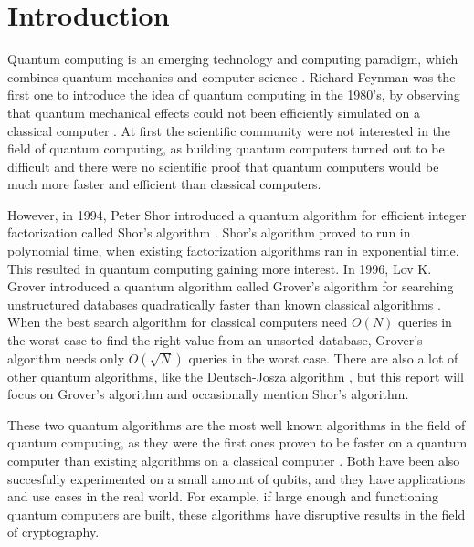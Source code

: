 \documentclass[english,oneside,openright]{UH_DS_report}
\begin{document}
\chapter{Introduction}
\label{chapter:intro}

Quantum computing is an emerging technology and computing paradigm, which combines quantum mechanics and computer science \cite{ambainis2004quantum, qcdb}. Richard Feynman was the first one to introduce the idea of quantum computing in the 1980's, by observing that quantum mechanical effects could not been efficiently simulated on a classical computer \cite{introtoqc}. At first the scientific community were not interested in the field of quantum computing, as building quantum computers turned out to be difficult and there were no scientific proof that quantum computers would be much more faster and efficient than classical computers. 

However, in 1994, Peter Shor introduced a quantum algorithm for efficient integer factorization called Shor's algorithm \cite{introtoqc}. Shor's algorithm proved to run in polynomial time, when existing factorization algorithms ran in exponential time. This resulted in quantum computing gaining more interest. In 1996, Lov K. Grover introduced a quantum algorithm called Grover's algorithm for searching unstructured databases quadratically faster than known classical algorithms \cite{grover1996fast}. When the best search algorithm for classical computers need $O(N)$ queries in the worst case to find the right value from an unsorted database, Grover's algorithm needs only $O(\sqrt{N})$ queries in the worst case. There are also a lot of other quantum algorithms, like the Deutsch-Josza algorithm \cite{giri2017review}, but this report will focus on Grover's algorithm and occasionally mention Shor's algorithm.

These two quantum algorithms are the most well known algorithms in the field of quantum computing, as they were the first ones proven to be faster on a quantum computer than existing algorithms on a classical computer \cite{ambainis2004quantum}. Both have been also succesfully experimented on a small amount of qubits, and they have applications and use cases in the real world. For example, if large enough and functioning quantum computers are built, these algorithms have disruptive results in the field of cryptography.
\end{document}
